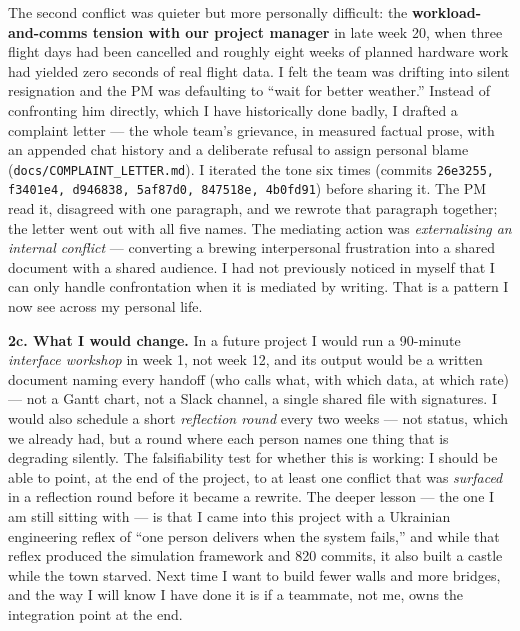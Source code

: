 The second conflict was quieter but more personally difficult: the \textbf{workload-and-comms tension with our project manager} in late week 20, when three flight days had been cancelled and roughly eight weeks of planned hardware work had yielded zero seconds of real flight data. I felt the team was drifting into silent resignation and the PM was defaulting to ``wait for better weather.'' Instead of confronting him directly, which I have historically done badly, I drafted a complaint letter --- the whole team's grievance, in measured factual prose, with an appended chat history and a deliberate refusal to assign personal blame (\texttt{docs/COMPLAINT\_LETTER.md}). I iterated the tone six times (commits \texttt{26e3255, f3401e4, d946838, 5af87d0, 847518e, 4b0fd91}) before sharing it. The PM read it, disagreed with one paragraph, and we rewrote that paragraph together; the letter went out with all five names. The mediating action was \emph{externalising an internal conflict} --- converting a brewing interpersonal frustration into a shared document with a shared audience. I had not previously noticed in myself that I can only handle confrontation when it is mediated by writing. That is a pattern I now see across my personal life.

\textbf{2c. What I would change.} In a future project I would run a 90-minute \emph{interface workshop} in week 1, not week 12, and its output would be a written document naming every handoff (who calls what, with which data, at which rate) --- not a Gantt chart, not a Slack channel, a single shared file with signatures. I would also schedule a short \emph{reflection round} every two weeks --- not status, which we already had, but a round where each person names one thing that is degrading silently. The falsifiability test for whether this is working: I should be able to point, at the end of the project, to at least one conflict that was \emph{surfaced} in a reflection round before it became a rewrite. The deeper lesson --- the one I am still sitting with --- is that I came into this project with a Ukrainian engineering reflex of ``one person delivers when the system fails,'' and while that reflex produced the simulation framework and 820 commits, it also built a castle while the town starved. Next time I want to build fewer walls and more bridges, and the way I will know I have done it is if a teammate, not me, owns the integration point at the end.
